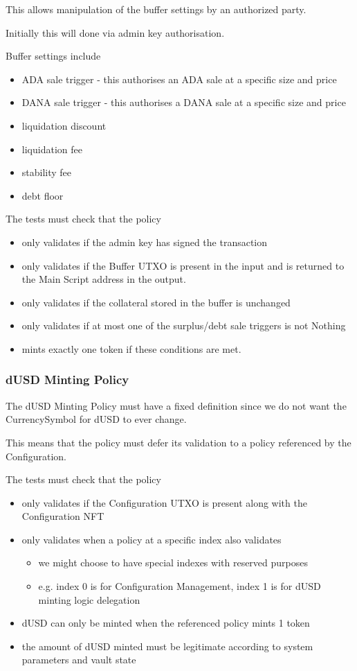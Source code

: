 \documentclass{article} %
\begin{document}
This allows manipulation of the buffer settings by an authorized party.

Initially this will done via admin key authorisation.

Buffer settings include
\begin{itemize}
  \item ADA sale trigger - this authorises an ADA sale at a specific size and price
  \item DANA sale trigger - this authorises a DANA sale at a specific size and price
  \item liquidation discount
  \item liquidation fee
  \item stability fee
  \item debt floor
\end{itemize}

The tests must check that the policy
\begin{itemize}
  \item only validates if the admin key has signed the transaction
  \item only validates if the Buffer UTXO is present in the input and is returned to the Main Script address in the output.
  \item only validates if the collateral stored in the buffer is unchanged
  \item only validates if at most one of the surplus/debt sale triggers is not Nothing
  \item mints exactly one token if these conditions are met.
\end{itemize}

\subsubsection{dUSD Minting Policy}
The dUSD Minting Policy must have a fixed definition since we do not want the CurrencySymbol for dUSD to ever change.

This means that the policy must defer its validation to a policy referenced by the Configuration.

The tests must check that the policy
\begin{itemize}
  \item only validates if the Configuration UTXO is present along with the Configuration NFT
  \item only validates when a policy at a specific index also validates
  \begin{itemize}
    \item we might choose to have special indexes with reserved purposes
    \item e.g. index 0 is for Configuration Management, index 1 is for dUSD minting logic delegation
  \end{itemize}
  \item dUSD can only be minted when the referenced policy mints 1 token
  \item the amount of dUSD minted must be legitimate according to system parameters and vault state
\end{itemize}
\end{document}
